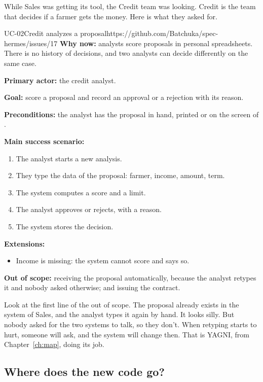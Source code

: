 While Sales was getting its tool, the Credit team was looking. Credit is the
team that decides if a farmer gets the money. Here is what they asked for.

\begin{usecase}{UC-02}{Credit analyzes a proposal}{https://github.com/Batchuka/spec-hermes/issues/17}
\textbf{Why now:} analysts score proposals in personal spreadsheets. There is
no history of decisions, and two analysts can decide differently on the same
case.

\textbf{Primary actor:} the credit analyst.

\textbf{Goal:} score a proposal and record an approval or a rejection with its
reason.

\textbf{Preconditions:} the analyst has the proposal in hand, printed or on
the screen of .

\textbf{Main success scenario:}
\begin{enumerate}
  \item The analyst starts a new analysis.
  \item They type the data of the proposal: farmer, income, amount, term.
  \item The system computes a score and a limit.
  \item The analyst approves or rejects, with a reason.
  \item The system stores the decision.
\end{enumerate}

\textbf{Extensions:}
\begin{itemize}
  \item[3a.] Income is missing: the system cannot score and says so.
\end{itemize}

\textbf{Out of scope:} receiving the proposal automatically, because the
analyst retypes it and nobody asked otherwise; and issuing the contract.
\end{usecase}

Look at the first line of the out of scope. The proposal already exists in
the system of Sales, and the analyst types it again by hand. It looks silly.
But nobody asked for the two systems to talk, so they don't. When retyping
starts to hurt, someone will ask, and the system will change then. That is
YAGNI, from Chapter~\ref{ch:map}, doing its job.

\subsection*{Where does the new code go?}

